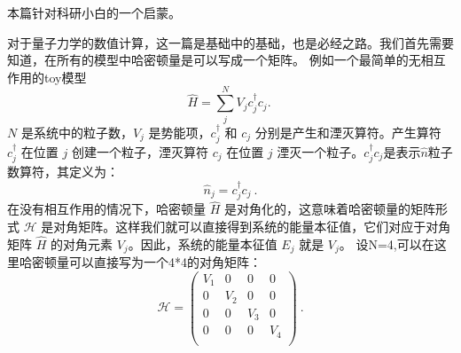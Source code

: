
\begin{issues}
\issueDraft       %
\end{issues}
本篇针对科研小白的一个启蒙。

对于量子力学的数值计算，这一篇是基础中的基础，也是必经之路。我们首先需要知道，在所有的模型中哈密顿量是可以写成一个矩阵。
例如一个最简单的无相互作用的toy模型
\begin{equation}\label{ham1}
\hat{H}=  \sum_j^{N}V_j c_j^{\dagger}c_j.~
\end{equation}
$N$ 是系统中的粒子数，$V_j$ 是势能项，$c_j^{\dagger}$ 和 $c_j$ 分别是产生和湮灭算符。产生算符 $c_j^{\dagger}$ 在位置 $j$ 创建一个粒子，湮灭算符 $c_j$ 在位置 $j$ 湮灭一个粒子。$c_j^{\dagger}c_j$是表示$\hat{n}$粒子数算符，其定义为：
\begin{equation}
\hat{n}_j = c_j^{\dagger} c_j~.
\end{equation}
在没有相互作用的情况下，哈密顿量 $\hat{H}$ 是对角化的，这意味着哈密顿量的矩阵形式 $\mathcal{H}$ 是对角矩阵。这样我们就可以直接得到系统的能量本征值，它们对应于对角矩阵 $\hat{H}$ 的对角元素 $V_j$。因此，系统的能量本征值 ${E_j}$ 就是 ${V_j}$。
设N=4,可以在这里哈密顿量可以直接写为一个4*4的对角矩阵：
\begin{equation}
\mathcal{H}=\left(
\begin{matrix}
V_1 & 0& 0&0\\
0 &V_2&0&0\\
0&0&V_3&0\\
0&0&0&V_4\\
\end{matrix}
\right)~.
\end{equation}
